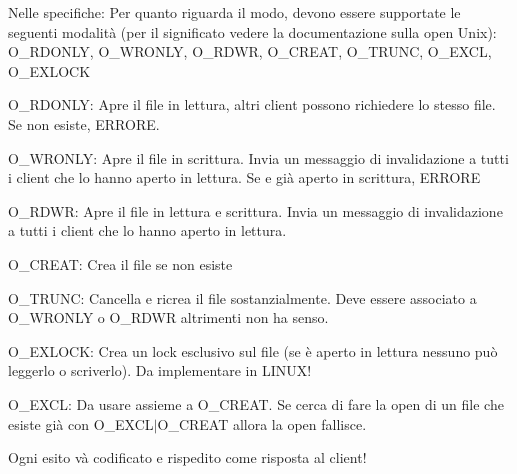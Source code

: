 Nelle specifiche\+: Per quanto riguarda il modo, devono essere supportate le seguenti modalità (per il significato vedere la documentazione sulla open Unix)\+: O\+\_\+\+R\+D\+O\+N\+L\+Y, O\+\_\+\+W\+R\+O\+N\+L\+Y, O\+\_\+\+R\+D\+W\+R, O\+\_\+\+C\+R\+E\+A\+T, O\+\_\+\+T\+R\+U\+N\+C, O\+\_\+\+E\+X\+C\+L, O\+\_\+\+E\+X\+L\+O\+C\+K


\begin{DoxyItemize}
\item O\+\_\+\+R\+D\+O\+N\+L\+Y\+: Apre il file in lettura, altri client possono richiedere lo stesso file. Se non esiste, E\+R\+R\+O\+R\+E.
\item O\+\_\+\+W\+R\+O\+N\+L\+Y\+: Apre il file in scrittura. Invia un messaggio di invalidazione a tutti i client che lo hanno aperto in lettura. Se e\textquotesingle{} già aperto in scrittura, E\+R\+R\+O\+R\+E
\item O\+\_\+\+R\+D\+W\+R\+: Apre il file in lettura e scrittura. Invia un messaggio di invalidazione a tutti i client che lo hanno aperto in lettura.
\item O\+\_\+\+C\+R\+E\+A\+T\+: Crea il file se non esiste
\item O\+\_\+\+T\+R\+U\+N\+C\+: Cancella e ricrea il file sostanzialmente. Deve essere associato a O\+\_\+\+W\+R\+O\+N\+L\+Y o O\+\_\+\+R\+D\+W\+R altrimenti non ha senso.
\item O\+\_\+\+E\+X\+L\+O\+C\+K\+: Crea un lock esclusivo sul file (se è aperto in lettura nessuno può leggerlo o scriverlo). Da implementare in L\+I\+N\+U\+X!
\item O\+\_\+\+E\+X\+C\+L\+: Da usare assieme a O\+\_\+\+C\+R\+E\+A\+T. Se cerca di fare la open di un file che esiste già con O\+\_\+\+E\+X\+C\+L$\vert$\+O\+\_\+\+C\+R\+E\+A\+T allora la open fallisce.
\end{DoxyItemize}

Ogni esito và codificato e rispedito come risposta al client! 
